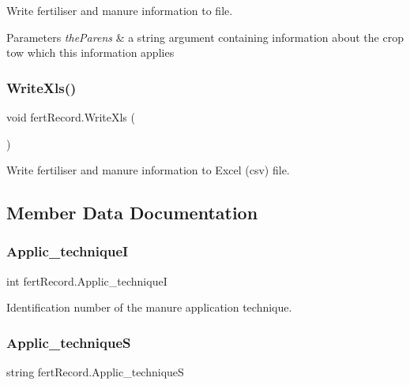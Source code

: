 Write fertiliser and manure information to file. 


\begin{DoxyParams}{Parameters}
{\em the\+Parens} & a string argument containing information about the crop tow which this information applies \\
\hline
\end{DoxyParams}
\mbox{\label{classfert_record_a2874f8deff980009390d942b02d49bc5}} 
\subsubsection{\texorpdfstring{WriteXls()}{WriteXls()}}
{\footnotesize\ttfamily void fert\+Record.\+Write\+Xls (\begin{DoxyParamCaption}{ }\end{DoxyParamCaption})\hspace{0.3cm}{\ttfamily [inline]}}



Write fertiliser and manure information to Excel (csv) file. 



\subsection{Member Data Documentation}
\mbox{\label{classfert_record_acd5d93cefcdeac346e4f2da0d794b02e}} 
\subsubsection{\texorpdfstring{Applic\_techniqueI}{Applic\_techniqueI}}
{\footnotesize\ttfamily int fert\+Record.\+Applic\+\_\+techniqueI}

Identification number of the manure application technique. \mbox{\label{classfert_record_af8971d0933ac0e105cff348940b15e72}} 
\subsubsection{\texorpdfstring{Applic\_techniqueS}{Applic\_techniqueS}}
{\footnotesize\ttfamily string fert\+Record.\+Applic\+\_\+techniqueS}


